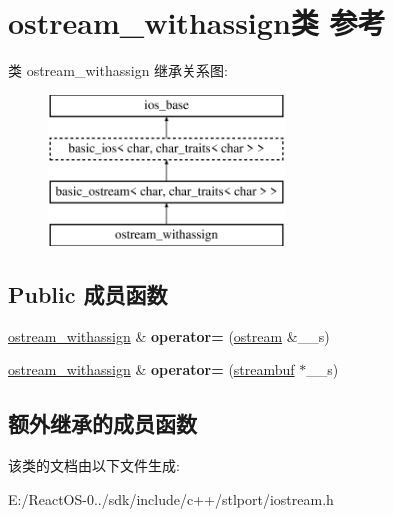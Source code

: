 \hypertarget{classostream__withassign}{}\section{ostream\+\_\+withassign类 参考}
\label{classostream__withassign}
类 ostream\+\_\+withassign 继承关系图\+:\begin{figure}[H]
\begin{center}
\leavevmode
\includegraphics[height=4.000000cm]{classostream__withassign}
\end{center}
\end{figure}
\subsection*{Public 成员函数}
\begin{DoxyCompactItemize}
\item 
\mbox{\label{classostream__withassign_a67afd2c3b58a369f22f0f72166eaa5d6}} 
\hyperlink{classostream__withassign}{ostream\+\_\+withassign} \& {\bfseries operator=} (\hyperlink{classbasic__ostream}{ostream} \&\+\_\+\+\_\+s)
\item 
\mbox{\label{classostream__withassign_a8f896ec2856b486c29ed7f398081e7d2}} 
\hyperlink{classostream__withassign}{ostream\+\_\+withassign} \& {\bfseries operator=} (\hyperlink{classbasic__streambuf}{streambuf} $\ast$\+\_\+\+\_\+s)
\end{DoxyCompactItemize}
\subsection*{额外继承的成员函数}


该类的文档由以下文件生成\+:\begin{DoxyCompactItemize}
\item 
E\+:/\+React\+O\+S-\/0../sdk/include/c++/stlport/iostream.\+h\end{DoxyCompactItemize}
